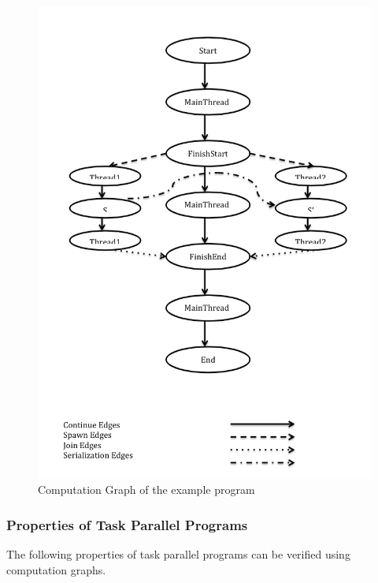 \begin{figure}[h!]
\begin{minipage}[b]{0.35\linewidth}
\includegraphics[scale=0.3]{../figs/Fig2.jpg}
\caption{Computation Graph of the example program}
\label{fig:minipage2}
\end{minipage}
\end{figure}

\subsubsection{Properties of Task Parallel Programs}
The following properties of task parallel programs can be verified using computation graphs.

